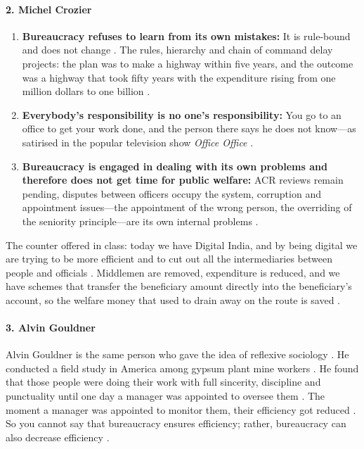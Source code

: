 \paragraph{2. Michel Crozier}
\begin{enumerate}
    \item \textbf{Bureaucracy refuses to learn from its own mistakes:} It is rule-bound and does not change . The rules, hierarchy and chain of command delay projects: the plan was to make a highway within five years, and the outcome was a highway that took fifty years with the expenditure rising from one million dollars to one billion .
    \item \textbf{Everybody's responsibility is no one's responsibility:} You go to an office to get your work done, and the person there says he does not know---as satirised in the popular television show \textit{Office Office} .
    \item \textbf{Bureaucracy is engaged in dealing with its own problems and therefore does not get time for public welfare:} ACR reviews remain pending, disputes between officers occupy the system, corruption and appointment issues---the appointment of the wrong person, the overriding of the seniority principle---are its own internal problems .
\end{enumerate}

\begin{GovtPolicy}
The counter offered in class: today we have Digital India, and by being digital we are trying to be more efficient and to cut out all the intermediaries between people and officials .
Middlemen are removed, expenditure is reduced, and we have schemes that transfer the beneficiary amount directly into the beneficiary's account, so the welfare money that used to drain away on the route is saved .
\end{GovtPolicy}

\paragraph{3. Alvin Gouldner}
Alvin Gouldner is the same person who gave the idea of reflexive sociology .
He conducted a field study in America among gypsum plant mine workers . He found that those people were doing their work with full sincerity, discipline and punctuality until one day a manager was appointed to oversee them .
The moment a manager was appointed to monitor them, their efficiency got reduced . So you cannot say that bureaucracy ensures efficiency; rather, bureaucracy can also decrease efficiency .

